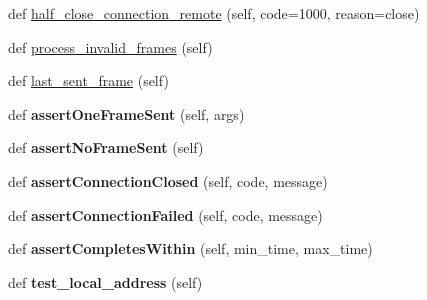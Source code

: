 \begin{DoxyCompactItemize}
def \hyperlink{classwebsockets_1_1test__protocol_1_1_common_tests_ac87a3d4ec375e6a1decc055686e62574}{half\+\_\+close\+\_\+connection\+\_\+remote} (self, code=1000, reason=\textquotesingle{}close\textquotesingle{})
\item 
def \hyperlink{classwebsockets_1_1test__protocol_1_1_common_tests_a9a2dab3248e4839526c94dec66017e90}{process\+\_\+invalid\+\_\+frames} (self)
\item 
def \hyperlink{classwebsockets_1_1test__protocol_1_1_common_tests_a06e19646b0fda6923ed411882d938e87}{last\+\_\+sent\+\_\+frame} (self)
\item 
\mbox{\label{classwebsockets_1_1test__protocol_1_1_common_tests_a545cf3bfce1bad4d5479e63106c2d177}} 
def {\bfseries assert\+One\+Frame\+Sent} (self, args)
\item 
\mbox{\label{classwebsockets_1_1test__protocol_1_1_common_tests_ad0a23365ec612d6ea294de36a099c8ca}} 
def {\bfseries assert\+No\+Frame\+Sent} (self)
\item 
\mbox{\label{classwebsockets_1_1test__protocol_1_1_common_tests_a4f6d2e39693742092b09af5c0eab6c0a}} 
def {\bfseries assert\+Connection\+Closed} (self, code, message)
\item 
\mbox{\label{classwebsockets_1_1test__protocol_1_1_common_tests_a32d83c1d0d217d640d989fc22ea20479}} 
def {\bfseries assert\+Connection\+Failed} (self, code, message)
\item 
\mbox{\label{classwebsockets_1_1test__protocol_1_1_common_tests_adb2b42d20848daca76029b76a1db117c}} 
def {\bfseries assert\+Completes\+Within} (self, min\+\_\+time, max\+\_\+time)
\item 
\mbox{\label{classwebsockets_1_1test__protocol_1_1_common_tests_a3f49c38c46cc415ab55b6749ad37c6c4}} 
def {\bfseries test\+\_\+local\+\_\+address} (self)
\item 
\mbox{\label{classwebsockets_1_1test__protocol_1_1_common_tests_afadc234b90ff475ff87e17787a551db3}} 

\end{DoxyCompactItemize}

